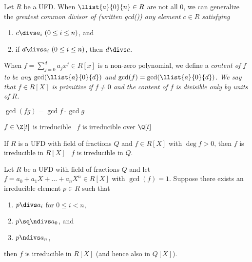 \documentclass[a4paper]{article}
\begin{document}
\begin{tdefinition}
  Let \( R \) be a UFD.
  When \( \llist{a}{0}{n}\in R \) are not all 0, we can generalize the \it{greatest common divisor} of  (written gcd()) any element \( c\in R \) satisfying \begin{enumerate}[label=(\roman*)]
    \item \( c\divs a_i\ (0\leq i\leq n) \), and
    \item if \( d\divs a_i\ (0\leq i\leq n) \), then \( d\divs c \).
  \end{enumerate}
  When \( f=\sum_{j=0}^{d}a_jx^j\in R[x] \) is a non-zero polynomial, we define a \it{content} of \( f \) to be any \( \gcd (\llist{a}{0}{d}) \) and \( \gcd(f) = \gcd(\llist{a}{0}{d}) \).
  We say that \( f\in R[X] \) is \it{primitive} if \( f\neq 0 \) and the content of \( f \) is divisible only by units of \( R \).
\end{tdefinition}

\begin{tlemma}[Gauss]
  \( \gcd(fg) = \gcd f \cdot \gcd g\)
\end{tlemma}

\begin{tcorollary}
  \( f\in\Z[t] \) is irreducible \iff~\( f \) is irreducible over \( \Q[t] \)
\end{tcorollary}

\begin{tcorollary}
  If \( R \) is a UFD with field of fractions \( Q \) and \( f \in R[X] \) with \( \deg f > 0 \), then \( f \) is irreducible in \( R[X] \) \iff~\( f \) is irreducible in \( Q \).
\end{tcorollary}

\begin{ttheorem}
  Let \( R \) be a UFD with field of fractions \( Q \) and let \( f=a_0+a_1X+\ldots +a_nX^n \in R[X] \) with \( \gcd(f) = 1 \).
  Suppose there exists an irreducible element \( p \in R \) such that
  \begin{enumerate}[label=(\roman*)]
    \item \( p\divs a_i \) for \( 0\leq i < n \),
    \item \( p\sq \ndivs a_0 \), and
    \item \( p\ndivs a_n \),
  \end{enumerate}
  then \( f \) is irreducible in \( R[X] \) (and hence also in \( Q[X] \)).
\end{ttheorem}
\end{document}

